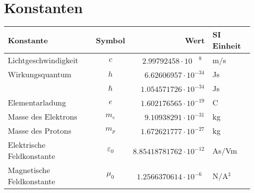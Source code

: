 \chapter{Konstanten\label{chapter:konstanten}}
\rhead{}
\begin{center}
\begin{tabular}{lcrl}
\hline
Konstante&Symbol&Wert&SI Einheit\\
\hline
Lichtgeschwindigkeit     &$c$            &$2.99792458\cdot 10^{\phantom{-}8\phantom{0}}$&m/s\\
Wirkungsquantum          &$h$            &$6.62606957\cdot 10^{-34}$   &Js\\
                         &$\hbar$        &$1.054571726\cdot 10^{-34}$  &Js\\
Elementarladung          &$e$            &$1.602176565\cdot 10^{-19}$  &C \\
Masse des Elektrons      &$m_e$          &$9.10938291\cdot 10^{-31}$   &kg\\
Masse des Protons        &$m_p$          &$1.672621777\cdot 10^{-27}$  &kg\\
Elektrische Feldkonstante&$\varepsilon_0$&$8.85418781762\cdot 10^{-12}$&As/Vm\\
Magnetische Feldkonstante&$\mu_0$        &$1.2566370614\cdot 10^{-6\phantom{0}}$  &N/A$\mathstrut^2$\\
\hline
\end{tabular}
\end{center}

